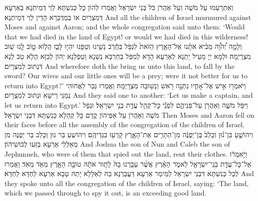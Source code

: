{וְאִתְרָעַמוּ עַל מֹשֶׁה וְעַל אַהֲרֹן כֹּל בְּנֵי יִשְׂרָאֵל וַאֲמַרוּ לְהוֹן כָּל כְּנִשְׁתָּא לְוֵי דְּמֵיתְנָא בְּאַרְעָא דְּמִצְרַיִם אוֹ בְּמַדְבְּרָא הָדֵין לְוֵי דְּמֵיתְנָא׃}
{And all the children of Israel murmured against Moses and against Aaron; and the whole congregation said unto them: ‘Would that we had died in the land of Egypt! or would we had died in this wilderness!}{}
{וְלָמָ֣ה יְ֠הֹוָ֠ה מֵבִ֨יא אֹתָ֜נוּ אֶל־הָאָ֤רֶץ הַזֹּאת֙ לִנְפֹּ֣ל בַּחֶ֔רֶב נָשֵׁ֥ינוּ וְטַפֵּ֖נוּ יִהְי֣וּ לָבַ֑ז הֲל֧וֹא ט֦וֹב לָ֖נוּ שׁ֥וּב מִצְרָֽיְמָה׃}
{וּלְמָא יְיָ מַעֵיל יָתַנָא לְאַרְעָא הָדָא לְמִפַּל בְּחַרְבָּא נְשַׁנָא וְטַפְלַנָא יְהוֹן לְבִזָּא הֲלָא טָב לַנָא דִּנְתוּב לְמִצְרָיִם׃}
{And wherefore doth the \lord\space bring us unto this land, to fall by the sword? Our wives and our little ones will be a prey; were it not better for us to return into Egypt?’}{}
{וַיֹּאמְר֖וּ אִ֣ישׁ אֶל־אָחִ֑יו נִתְּנָ֥ה רֹ֖אשׁ וְנָשׁ֥וּבָה מִצְרָֽיְמָה׃
}
{וַאֲמַרוּ גְּבַר לַאֲחוּהִי נְמַנֵּי רֵישָׁא וּנְתוּב לְמִצְרָיִם׃}
{And they said one to another: ‘Let us make a captain, and let us return into Egypt.’}{}
{וַיִּפֹּ֥ל מֹשֶׁ֛ה וְאַהֲרֹ֖ן עַל־פְּנֵיהֶ֑ם לִפְנֵ֕י כׇּל־קְהַ֥ל עֲדַ֖ת בְּנֵ֥י יִשְׂרָאֵֽל׃}
{וּנְפַל מֹשֶׁה וְאַהֲרֹן עַל אַפֵּיהוֹן קֳדָם כָּל קְהָלָא כְּנִשְׁתָּא דִּבְנֵי יִשְׂרָאֵל׃}
{Then Moses and Aaron fell on their faces before all the assembly of the congregation of the children of Israel.}{}
{וִיהוֹשֻׁ֣עַ בִּן־נ֗וּן וְכָלֵב֙ בֶּן־יְפֻנֶּ֔ה מִן־הַתָּרִ֖ים אֶת־הָאָ֑רֶץ קָרְע֖וּ בִּגְדֵיהֶֽם׃}
{וִיהוֹשֻעַ בַּר נוּן וְכָלֵב בַּר יְפֻנֶּה מִן מְאַלְּלֵי אַרְעָא בַּזַּעוּ לְבוּשֵׁיהוֹן׃}
{And Joshua the son of Nun and Caleb the son of Jephunneh, who were of them that spied out the land, rent their clothes.}{}
{וַיֹּ֣אמְר֔וּ אֶל־כׇּל־עֲדַ֥ת בְּנֵֽי־יִשְׂרָאֵ֖ל לֵאמֹ֑ר הָאָ֗רֶץ אֲשֶׁ֨ר עָבַ֤רְנוּ בָהּ֙ לָת֣וּר אֹתָ֔הּ טוֹבָ֥ה הָאָ֖רֶץ מְאֹ֥ד מְאֹֽד׃}
{וַאֲמַרוּ לְכָל כְּנִשְׁתָּא דִּבְנֵי יִשְׂרָאֵל לְמֵימַר אַרְעָא דַּעֲבַרְנָא בַהּ לְאַלָּלָא יָתַהּ טָבָא אַרְעָא לַחְדָּא לַחְדָּא׃}
{And they spoke unto all the congregation of the children of Israel, saying: ‘The land, which we passed through to spy it out, is an exceeding good land.}{}
